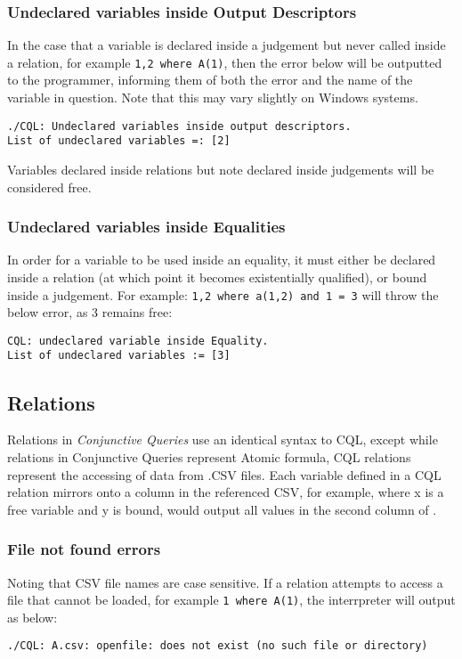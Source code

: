 \subsubsection{Undeclared variables inside Output Descriptors}
In the case that a variable is declared inside a judgement but never called inside a relation, for example \lstinline!1,2 where A(1)!, then the error below will be outputted to the programmer, informing them of both the error and the name of the variable in question. Note that this may vary slightly on Windows systems.
\begin{lstlisting}[style=framed]
./CQL: Undeclared variables inside output descriptors.
List of undeclared variables =: [2]
\end{lstlisting}
Variables declared inside relations but note declared inside judgements will be considered free.

\subsubsection{Undeclared variables inside Equalities}
In order for a variable to be used inside an equality, it must either be declared inside a relation (at which point it becomes existentially qualified), or bound inside a judgement. For example: \lstinline!1,2 where a(1,2) and 1 = 3! will throw the below error, as 3 remains free:
\begin{lstlisting}[style=framed]
CQL: undeclared variable inside Equality.
List of undeclared variables := [3]
\end{lstlisting}

\subsection{Relations}
Relations in \textit{Conjunctive Queries} use an identical syntax to CQL, except while relations in Conjunctive Queries represent Atomic formula, CQL relations represent the accessing of data from .CSV files.  Each variable defined in a CQL relation mirrors onto a column in the referenced CSV, for example,  where x is a free variable and y is bound, would output all values in the second column of . 

\subsubsection{File not found errors}
Noting that CSV file names are case sensitive. If a relation attempts to access a file that cannot be loaded, for example \lstinline!1 where A(1)!, the interrpreter will output as below:
\begin{lstlisting}[style=framed]
./CQL: A.csv: openfile: does not exist (no such file or directory)
\end{lstlisting}

